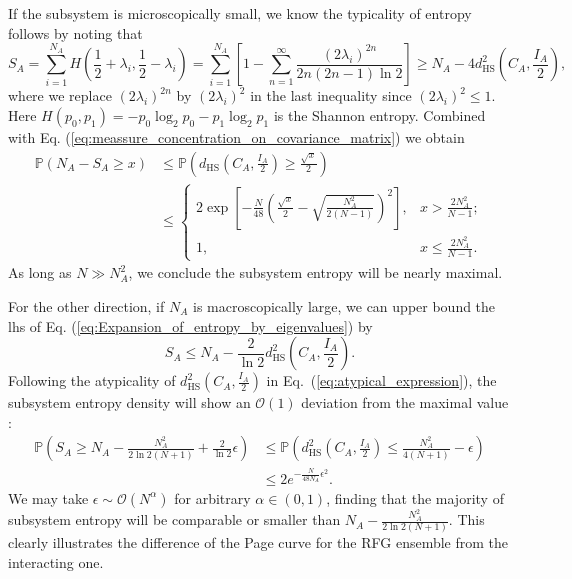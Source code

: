 If the subsystem is microscopically small, we know the typicality of entropy
follows by noting that 
\begin{equation}
S_A=\sum_{i=1}^{N_{A}}H\left(\frac{1}{2}+\lambda_{i},\frac{1}{2}-\lambda_{i}\right)=\sum_{i=1}^{N_{A}}\left[1-\sum_{n=1}^{\infty}\frac{(2\lambda_{i})^{2n}}{2n(2n-1)\ln2}\right]\geq N_{A}-4d_{\mathrm{HS}}^{2}\left(C_{A},\frac{I_{A}}{2}\right),
\label{eq:Expansion_of_entropy_by_eigenvalues}
\end{equation}
where we replace $(2\lambda_i)^{2n}$ by $(2\lambda_i)^2$ in the last inequality since $(2\lambda_{i})^{2}\leq1$. Here $H(p_0,p_1)=-p_0\log_2 p_0 - p_1\log_2 p_1$ is the Shannon entropy. Combined with Eq. (\ref{eq:meassure_concentration_on_covariance_matrix})
we obtain
\begin{equation}
\begin{split}\mathbb{P}(N_{A}-S_A\geq x) & \leq\mathbb{P}\left(d_{\mathrm{HS}}\left(C_{A},\frac{I_{A}}{2}\right)\geq\frac{\sqrt{x}}{2}\right)\\
 & \leq\begin{cases}
2\exp\left[-\frac{N}{48}\left(\frac{\sqrt{x}}{2}-\sqrt{\frac{N_{A}^{2}}{2(N-1)}}\right)^{2}\right], & x>\frac{2N_{A}^{2}}{N-1};\\
1, & x\leq\frac{2N_{A}^{2}}{N-1}.
\end{cases}
\label{eq:typicality_for_subsystem_entropy}
\end{split}
\end{equation}
As long as $N\gg N_{A}^{2}$, we conclude the subsystem entropy will
be nearly maximal. 

For the other direction, if $N_{A}$ is macroscopically large, we can upper %
bound the lhs of Eq. (\ref{eq:Expansion_of_entropy_by_eigenvalues}) by
\begin{equation}
S_A\leq N_{A}-\frac{2}{\ln2}d_{\mathrm{HS}}^{2}\left(C_{A},\frac{I_{A}}{2}\right).
\end{equation}
Following the atypicality of $d_{\mathrm{HS}}^{2}(C_{A},\frac{I_{A}}{2})$
in Eq.~(\ref{eq:atypical_expression}), the subsystem entropy density
will show an $\mathcal{O}(1)$ deviation from the maximal value%
:
\begin{equation}
\begin{split}\mathbb{P}\left(S_A\geq N_{A}-\frac{N_{A}^{2}}{2\ln2(N+1)}+\frac{2}{\ln2}\epsilon\right) & \leq\mathbb{P}\left(d_{\mathrm{HS}}^{2}\left(C_{A},\frac{I_{A}}{2}\right)\leq\frac{N_{A}^{2}}{4(N+1)}-\epsilon\right)\\
 & \leq2e^{-\frac{N}{48N_{A}}\epsilon^{2}}.
\end{split}
\end{equation}
We may take $\epsilon\sim\mathcal{O}(N^{\alpha})$ for arbitrary $\alpha\in(0,1)$,
finding that the majority of subsystem entropy will be comparable
or smaller than $N_{A}-\frac{N_{A}^{2}}{2\ln2(N+1)}$. This clearly
illustrates the difference of the Page curve for the RFG ensemble from
the interacting one.



